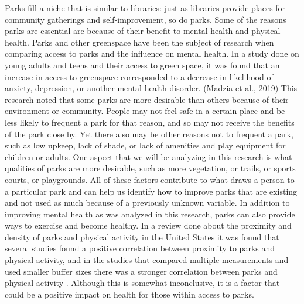 \documentclass[3p, authoryear]{elsarticle} %
\begin{document}
Parks fill a niche that is similar to libraries: just as libraries provide
places for community gatherings and self-improvement, so do parks. Some of the
reasons parks are essential are because of their benefit to mental health and
physical health. Parks and other greenspace have been the subject of research
when comparing access to parks and the influence on mental health. In a study
done on young adults and teens and their access to green space, it was found
that an increase in access to greenspace corresponded to a decrease in
likelihood of anxiety, depression, or another mental health disorder. (Madzia et
al., 2019) This research noted that some parks are more desirable than others
because of their environment or community. People may not feel safe in a certain
place and be less likely to frequent a park for that reason, and so may not
receive the benefits of the park close by. Yet there also may be other reasons
not to frequent a park, such as low upkeep, lack of shade, or lack of amenities
and play equipment for children or adults. One aspect that we will be analyzing
in this research is what qualities of parks are more desirable, such as more
vegetation, or trails, or sports courts, or playgrounds. All of these factors
contribute to what draws a person to a particular park and can help us identify
how to improve parks that are existing and not used as much because of a
previously unknown variable. In addition to improving mental health as was
analyzed in this research, parks can also provide ways to exercise and become
healthy. In a review done about the proximity and density of parks and physical
activity in the United States it was found that several studies found a positive
correlation between proximity to parks and physical activity, and in the studies
that compared multiple measurements and used smaller buffer sizes there was a
stronger correlation between parks and physical activity \citep{bancroft2015association}.
Although this is somewhat inconclusive, it is a factor that could be a positive
impact on health for those within access to parks.
\end{document}
